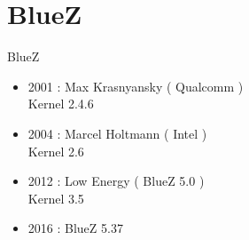 \section{BlueZ}
\begin{frame}
\begin{center}
\huge BlueZ
\end{center}
\begin{itemize}
	\item 2001 : Max Krasnyansky ( Qualcomm ) \\ Kernel 2.4.6
	\item 2004 : Marcel Holtmann ( Intel )\\ Kernel 2.6
	\item 2012 : Low Energy ( BlueZ 5.0 ) \\ Kernel 3.5
	\item 2016 : BlueZ 5.37
\end{itemize}
\end{frame}

